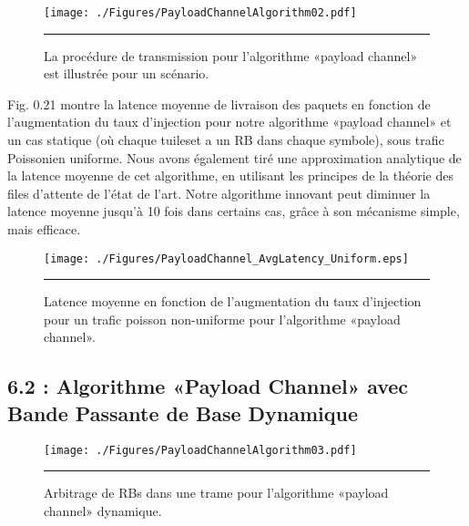 \begin{figure}[htbp]
  \centering
    \texttt{[image: ./Figures/PayloadChannelAlgorithm02.pdf]}
    \rule{35em}{0.5pt}
  \caption[La procédure de transmission sur «payload channel» est illustrée pour un scénario.]{La procédure de transmission pour l'algorithme «payload channel» est illustrée pour un scénario.}
  \label{fig:Electron}
\end{figure}

Fig. 0.21 montre la latence moyenne de livraison des paquets en fonction de l'augmentation du taux d'injection pour notre algorithme «payload channel» et un cas statique (où chaque tuileset a un RB dans chaque symbole), sous trafic Poissonien uniforme. Nous avons également tiré une approximation analytique de la latence moyenne de cet algorithme, en utilisant les principes de la théorie des files d'attente de l'état de l'art. Notre algorithme innovant peut diminuer la latence moyenne jusqu'à 10 fois dans certains cas, grâce à son mécanisme simple, mais efficace.


\begin{figure}[htbp]
  \centering
    \texttt{[image: ./Figures/PayloadChannel\_AvgLatency\_Uniform.eps]}
    \rule{35em}{0.5pt}
  \caption[Latence moyenne en fonction de l'augmentation du taux d'injection pour un trafic poisson non-uniforme pour l'algorithme «payload channel».]{Latence moyenne en fonction de l'augmentation du taux d'injection pour un trafic poisson non-uniforme pour l'algorithme «payload channel».}
  \label{fig:Electron}
\end{figure}

\subsection*{6.2 : Algorithme «Payload Channel» avec Bande Passante de Base Dynamique}

\begin{figure}[htbp]
  \centering
    \texttt{[image: ./Figures/PayloadChannelAlgorithm03.pdf]}
    \rule{35em}{0.5pt}
  \caption[Arbitrage de RBs dans une trame pour l'algorithme «payload channel» dynamique.]{Arbitrage de RBs dans une trame pour l'algorithme «payload channel» dynamique.}
  \label{fig:Electron}
\end{figure}

